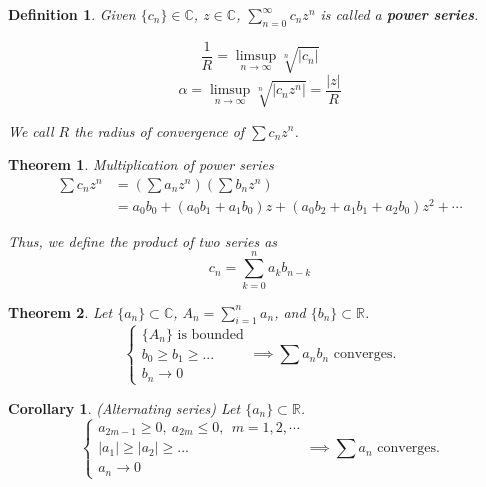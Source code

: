 \documentclass[aps,pra,onecolumn,notitlepage,superscriptaddress]{revtex4-1}
\newcommand{\R}{\mathbb{R}}
\newcommand{\C}{\mathbb{C}}
\newtheorem{theo}{Theorem}
\newtheorem{cor}{Corollary}
\newtheorem{defi}{Definition}
\begin{document}
    \begin{defi}
        Given $\{c_n\} \in \C$, $z \in \C$, $\sum_{n=0}^{\infty} c_n z^n$ is called a \textbf{power series}.

        \begin{equation}
            \frac{1}{R} = \limsup_{n \to \infty} \sqrt[n]{|c_n|}
        \end{equation}
        \begin{equation}
            \alpha = \limsup_{n \to \infty} \sqrt[n]{|c_nz^n|} = \frac{|z|}{R}
        \end{equation}

        We call $R$ the radius of convergence of $\sum c_n z^n$.
    \end{defi}

    \begin{theo}
        Multiplication of power series
        \begin{align*}
            \sum c_n z^n 
            &= \left(\sum a_n z^n \right)\left(\sum b_n z^n \right) \\
            &= a_0b_0 + (a_0b_1 + a_1b_0)z + (a_0b_2 + a_1b_1 + a_2b_0)z^2 + \cdots
        \end{align*}

        Thus, we define the product of two series as
        \begin{equation}
            c_n = \sum_{k=0}^n a_kb_{n-k}
        \end{equation}
    \end{theo}

    \begin{theo} Let $\{a_n\} \subset \C$, $A_n = \sum_{i=1}^n a_n$, and $\{b_n\} \subset \R$.
        \begin{equation}
            \begin{cases}
            \{ A_n \} \text{ is bounded} \\
            b_0 \geq b_1 \geq ... \\
            b_n \to 0
            \end{cases} \implies \sum a_n b_n \text{ converges.}
        \end{equation}
    \end{theo}

    \begin{cor}
        (Alternating series) Let $\{a_n\} \subset \R$.
        \begin{equation}
            \begin{cases}
            a_{2m-1} \geq 0, \ a_{2m} \leq 0, \ \ m = 1,2,\cdots \\
            |a_1| \geq |a_2| \geq ... \\
            a_n \to 0
            \end{cases} \implies \sum a_n \text{ converges.}
        \end{equation}
    \end{cor}
\end{document}
